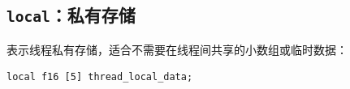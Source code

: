 \subsection*{\texttt{local}：私有存储}

\co@local@ 表示线程私有存储，适合不需要在线程间共享的小数组或临时数据：

\begin{lstlisting}[language=croqtile,caption={私有存储声明}]
local f16 [5] thread_local_data;
\end{lstlisting}
